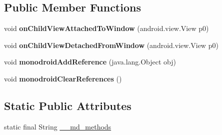 \subsection*{Public Member Functions}
\begin{DoxyCompactItemize}
\item 
\mbox{\label{classmono_1_1android_1_1support_1_1v7_1_1widget_1_1_recycler_view___on_child_attach_state_change_listener_implementor_adebfa7ea1dc476b00843dfd0752671ed}} 
void {\bfseries on\+Child\+View\+Attached\+To\+Window} (android.\+view.\+View p0)
\item 
\mbox{\label{classmono_1_1android_1_1support_1_1v7_1_1widget_1_1_recycler_view___on_child_attach_state_change_listener_implementor_af970163379808ec9a1e6bc73356a3d39}} 
void {\bfseries on\+Child\+View\+Detached\+From\+Window} (android.\+view.\+View p0)
\item 
\mbox{\label{classmono_1_1android_1_1support_1_1v7_1_1widget_1_1_recycler_view___on_child_attach_state_change_listener_implementor_a2cc613938339013be1dc352e67471797}} 
void {\bfseries monodroid\+Add\+Reference} (java.\+lang.\+Object obj)
\item 
\mbox{\label{classmono_1_1android_1_1support_1_1v7_1_1widget_1_1_recycler_view___on_child_attach_state_change_listener_implementor_ac8afdd86efc6fd6f205811277b854a49}} 
void {\bfseries monodroid\+Clear\+References} ()
\end{DoxyCompactItemize}
\subsection*{Static Public Attributes}
\begin{DoxyCompactItemize}
\item 
static final String \hyperlink{classmono_1_1android_1_1support_1_1v7_1_1widget_1_1_recycler_view___on_child_attach_state_change_listener_implementor_aaa15da75df7533f4e3467fa457218139}{\+\_\+\+\_\+md\+\_\+methods}
\end{DoxyCompactItemize}


